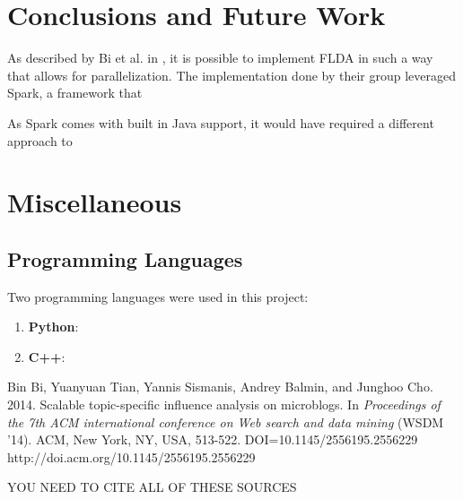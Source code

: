 \documentclass[a4paper]{article}
\begin{document}
\section{Conclusions and Future Work}
As described by Bi et al. in \cite{flda}, it is possible to implement FLDA in such a way that allows for parallelization. The implementation done by their group leveraged Spark, a framework that 



As Spark comes with built in Java support, it would have required a different approach to 

\section{Miscellaneous}
\subsection{Programming Languages}
Two programming languages were used in this project:
\begin{enumerate}
\item \textbf{Python}: 
\item \textbf{C++}: 
\end{enumerate}


\begin{thebibliography}{9}
Bin Bi, Yuanyuan Tian, Yannis Sismanis, Andrey Balmin, and Junghoo Cho. 2014. Scalable topic-specific influence analysis on microblogs. In \textit{Proceedings of the 7th ACM international conference on Web search and data mining} (WSDM '14). ACM, New York, NY, USA, 513-522. DOI=10.1145/2556195.2556229 http://doi.acm.org/10.1145/2556195.2556229

YOU NEED TO CITE ALL OF THESE SOURCES

\end{thebibliography}
\end{document}
